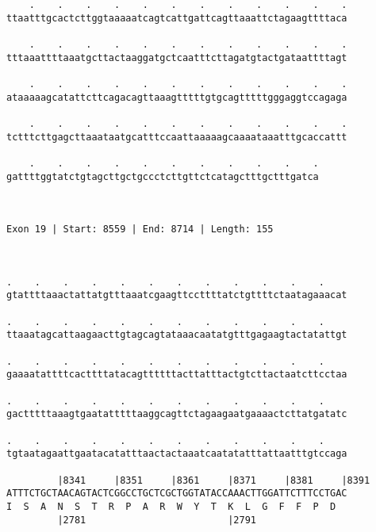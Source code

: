 \documentclass{article}
\begin{document}
\begin{Verbatim}
    .    .    .    .    .    .    .    .    .    .    .    .
ttaatttgcactcttggtaaaaatcagtcattgattcagttaaattctagaagttttaca
                                                            
    .    .    .    .    .    .    .    .    .    .    .    .
tttaaattttaaatgcttactaaggatgctcaatttcttagatgtactgataattttagt
                                                            
    .    .    .    .    .    .    .    .    .    .    .    .
ataaaaagcatattcttcagacagttaaagtttttgtgcagtttttgggaggtccagaga
                                                            
    .    .    .    .    .    .    .    .    .    .    .    .
tctttcttgagcttaaataatgcatttccaattaaaaagcaaaataaatttgcaccattt
                                                            
    .    .    .    .    .    .    .    .    .    .    .
gattttggtatctgtagcttgctgccctcttgttctcatagctttgctttgatca
                                                       
                                                       
 
Exon 19 | Start: 8559 | End: 8714 | Length: 155



.    .    .    .    .    .    .    .    .    .    .    .    
gtattttaaactattatgtttaaatcgaagttccttttatctgttttctaatagaaacat
                                                            
.    .    .    .    .    .    .    .    .    .    .    .    
ttaaatagcattaagaacttgtagcagtataaacaatatgtttgagaagtactatattgt
                                                            
.    .    .    .    .    .    .    .    .    .    .    .    
gaaaatattttcacttttatacagttttttacttatttactgtcttactaatcttcctaa
                                                            
.    .    .    .    .    .    .    .    .    .    .    .    
gactttttaaagtgaatatttttaaggcagttctagaagaatgaaaactcttatgatatc
                                                            
.    .    .    .    .    .    .    .    .    .    .    .    
tgtaatagaattgaatacatatttaactactaaatcaatatatttattaatttgtccaga
                                                            
         |8341     |8351     |8361     |8371     |8381     |8391
ATTTCTGCTAACAGTACTCGGCCTGCTCGCTGGTATACCAAACTTGGATTCTTTCCTGAC
I  S  A  N  S  T  R  P  A  R  W  Y  T  K  L  G  F  F  P  D  
         |2781                         |2791                
  

\end{Verbatim}
\end{document}
